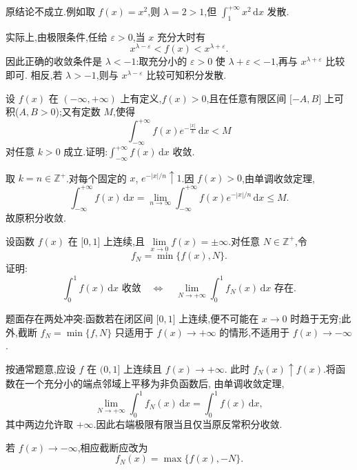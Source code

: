 \begin{solution}
  原结论不成立.例如取 $f(x)=x^2$,则 $\lambda=2>1$,但
  $\displaystyle\int_1^{+\infty}x^2\,\mathrm{d}x$ 发散.

  实际上,由极限条件,任给 $\varepsilon>0$,当 $x$ 充分大时有
  \[
    x^{\lambda-\varepsilon}<f(x)<x^{\lambda+\varepsilon}.
  \]
  因此正确的收敛条件是 $\lambda<-1$:取充分小的 $\varepsilon>0$ 使
  $\lambda+\varepsilon<-1$,再与 $x^{\lambda+\varepsilon}$ 比较即可.
  相反,若 $\lambda>-1$,则与 $x^{\lambda-\varepsilon}$ 比较可知积分发散.
\end{solution}

\begin{example}
  设 $f(x)$ 在 $(-\infty,+\infty)$ 上有定义,$f(x)>0$,且在任意有限区间 $\lbrack -A,B\rbrack$ 上可积($A,B>0$);又有定数 $M$,使得
  \[
    \displaystyle\int_{-\infty}^{+\infty}f(x)e^{-\frac{|x|}{k}}\,\mathrm{d}x<M
  \]
  对任意 $k>0$ 成立.证明:$\displaystyle\int_{-\infty}^{+\infty}f(x)\,\mathrm{d}x$ 收敛.
\end{example}
\exampleblank

\begin{solution}
  取 $k=n\in\mathbb{Z}^+$.对每个固定的 $x$,
  $e^{-|x|/n}\uparrow1$.因 $f(x)>0$,由单调收敛定理,
  \[
    \displaystyle\int_{-\infty}^{+\infty}f(x)\,\mathrm{d}x
    =\lim\limits_{n\to\infty}\int_{-\infty}^{+\infty}
    f(x)e^{-|x|/n}\,\mathrm{d}x\leq M.
  \]
  故原积分收敛.
\end{solution}

\begin{example}
  设函数 $f(x)$ 在 $\lbrack 0,1\rbrack$ 上连续,且 $\displaystyle\lim\limits_{x\to0}f(x)=\pm\infty$.对任意 $N\in\mathbb{Z}^+$,令
  \[
    f_N=\min\{f(x),N\}.
  \]
  证明:
  \[
    \displaystyle\int_0^1f(x)\,\mathrm{d}x\text{ 收敛}
    \quad\Longleftrightarrow\quad
    \lim\limits_{N\to+\infty}\int_0^1f_N(x)\,\mathrm{d}x\text{ 存在}.
  \]
\end{example}
\exampleblank

\begin{solution}
  题面存在两处冲突:函数若在闭区间 $\lbrack0,1\rbrack$ 上连续,便不可能在
  $x\to0$ 时趋于无穷;此外,截断 $f_N=\min\{f,N\}$ 只适用于
  $f(x)\to+\infty$ 的情形,不适用于 $f(x)\to-\infty$.

  按通常题意,应设 $f$ 在 $(0,1\rbrack$ 上连续且 $f(x)\to+\infty$.
  此时 $f_N(x)\uparrow f(x)$.将函数在一个充分小的端点邻域上平移为非负函数后,
  由单调收敛定理,
  \[
    \displaystyle\lim\limits_{N\to+\infty}\int_0^1f_N(x)\,\mathrm{d}x
    =\int_0^1f(x)\,\mathrm{d}x,
  \]
  其中两边允许取 $+\infty$.因此右端极限有限当且仅当原反常积分收敛.

  若 $f(x)\to-\infty$,相应截断应改为
  \[
    f_N(x)=\max\{f(x),-N\}.
  \]
\end{solution}

